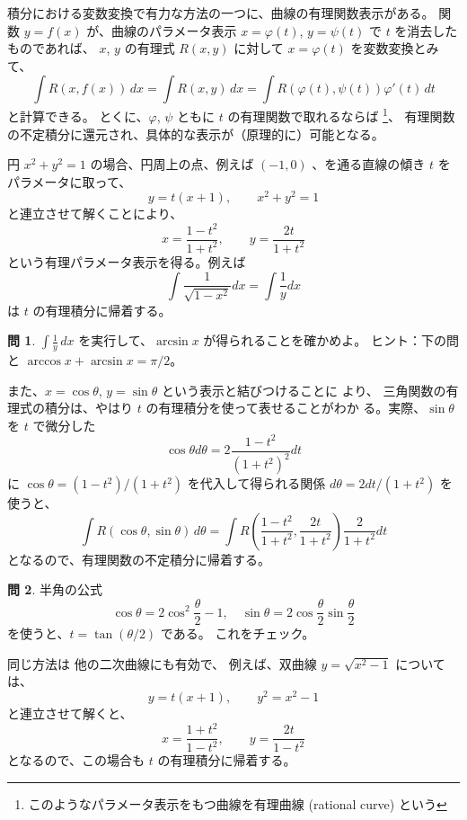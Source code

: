 \documentclass[a4paper]{jsarticle}
\theoremstyle{definition}
\newtheorem{Exercise}{問}%
\theoremstyle{remark}
\begin{document}
積分における変数変換で有力な方法の一つに、曲線の有理関数表示がある。
関数 $y = f(x)$ が、曲線のパラメータ表示
$x = \varphi(t)$, $y = \psi(t)$ で $t$ を消去したものであれば、
$x$, $y$ の有理式 $R(x,y)$ に対して
$x = \varphi(t)$ を変数変換とみて、
\[
\int R(x,f(x))\, dx = \int R(x,y)\,dx 
= \int R(\varphi(t),\psi(t)) \varphi'(t)\,dt
\]
と計算できる。
とくに、$\varphi$, $\psi$ ともに $t$ の有理関数で取れるならば
\footnote{
このようなパラメータ表示をもつ曲線を有理曲線 (rational curve) という
}、
有理関数の不定積分に還元され、具体的な表示が（原理的に）可能となる。

円 $x^2 + y^2 = 1$ の場合、円周上の点、例えば
$(-1,0)$ 、を通る直線の傾き $t$ をパラメータに取って、
\[
y = t(x+1), \qquad
x^2 + y^2 = 1
\]
と連立させて解くことにより、
\[
x = \frac{1-t^2}{1+t^2},
\qquad
y = \frac{2t}{1+t^2}
\]
という有理パラメータ表示を得る。例えば
\[
\int \frac{1}{\sqrt{1-x^2}} dx =
\int \frac{1}{y} dx
\]
は $t$ の有理積分に帰着する。

\begin{figure}[htbp]
  \begin{center}

\end{center}
\caption{}
\end{figure}

\begin{Exercise}
  $\int \frac{1}{y}\, dx$ を実行して、$\arcsin x$ が得られることを確かめよ。
  ヒント：下の問と $\arccos x + \arcsin x = \pi/2$。
\end{Exercise}

\bigskip
また、$x = \cos \theta$, $y = \sin \theta$ という表示と結びつけることに
より、
三角関数の有理式の積分は、やはり $t$ の有理積分を使って表せることがわか
る。実際、$\sin \theta$ を $t$ で微分した
\[
\cos\theta d\theta = 2 \frac{1-t^2}{(1+t^2)^2} dt
\]
に $\cos\theta = (1-t^2)/(1+t^2)$ を代入して得られる関係 
$d\theta = 2dt/(1+t^2)$ を使うと、
\[
\int R(\cos\theta,\sin\theta)\,d\theta = 
\int R
\left( 
\frac{1-t^2}{1+t^2}, \frac{2t}{1+t^2} 
\right) 
\frac{2}{1+t^2} dt
\]
となるので、有理関数の不定積分に帰着する。

\begin{Exercise}
半角の公式
\[
\cos\theta = 2\cos^2\frac{\theta}{2} - 1, 
\quad 
\sin\theta = 2\cos\frac{\theta}{2} \sin \frac{\theta}{2}
\]
を使うと、$t = \tan(\theta/2)$ である。
これをチェック。
\end{Exercise}

同じ方法は 他の二次曲線にも有効で、
例えば、双曲線 $y = \sqrt{x^2-1}$ については、
\[
y = t(x+1),
\qquad
y^2 = x^2 -1
\]
と連立させて解くと、
\[
x = \frac{1 + t^2}{1-t^2},
\qquad
y = \frac{2t}{1-t^2}
\]
となるので、この場合も $t$ の有理積分に帰着する。
\end{document}
